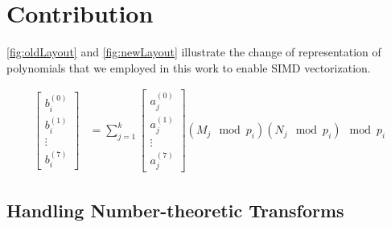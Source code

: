 \section{Contribution}

\figOldLayout
\figNewLayout

\autoref{fig:oldLayout} and \autoref{fig:newLayout} illustrate the change of
representation of polynomials that we employed in this work to enable SIMD
vectorization.

\begin{align*}
    \begin{bmatrix}
        b_i^{(0)} \\
        b_i^{(1)} \\
        \vdots \\
        b_i^{(7)}
        \end{bmatrix} &= \sum_{j=1}^k \begin{bmatrix}
        a_j^{(0)} \\
        a_j^{(1)} \\
        \vdots \\
        a_j^{(7)}
        \end{bmatrix}(M_j \mod p_i) (N_j \mod p_i) \mod p_i
\end{align*}

\subsection{Handling Number-theoretic Transforms}


